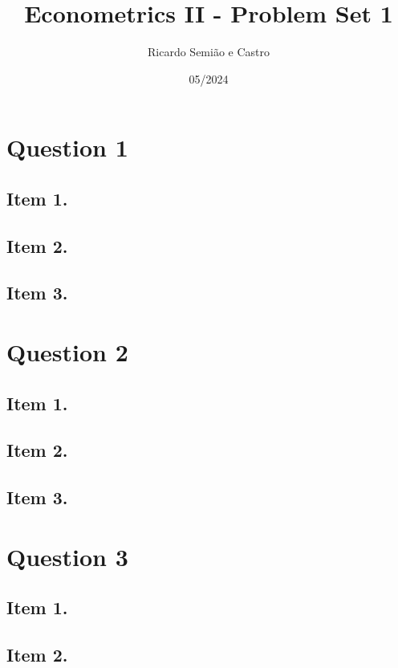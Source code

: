 \documentclass[12pt]{article}
\title{Econometrics II - Problem Set 1}
\author{Ricardo Semião e Castro}
\date{05/2024}
\begin{document}
\maketitle

\section*{Question 1}

\subsection*{Item 1.}

\subsection*{Item 2.}

\subsection*{Item 3.}

\section*{Question 2}

\subsection*{Item 1.}

\subsection*{Item 2.}

\subsection*{Item 3.}

\section*{Question 3}

\subsection*{Item 1.}

\subsection*{Item 2.}
\end{document}
